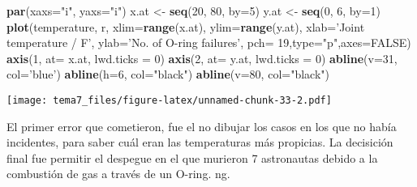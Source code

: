 \documentclass[]{article}
\newenvironment{Shaded}{\begin{snugshade}}{\end{snugshade}}
\newcommand{\KeywordTok}[1]{\textcolor[rgb]{0.13,0.29,0.53}{\textbf{{#1}}}}
\newcommand{\DataTypeTok}[1]{\textcolor[rgb]{0.13,0.29,0.53}{{#1}}}
\newcommand{\DecValTok}[1]{\textcolor[rgb]{0.00,0.00,0.81}{{#1}}}
\newcommand{\StringTok}[1]{\textcolor[rgb]{0.31,0.60,0.02}{{#1}}}
\newcommand{\OtherTok}[1]{\textcolor[rgb]{0.56,0.35,0.01}{{#1}}}
\newcommand{\NormalTok}[1]{{#1}}
\numberwithin{equation}{section}
\begin{document}
\begin{Shaded}
\begin{Highlighting}[]
\KeywordTok{par}\NormalTok{(}\DataTypeTok{xaxs=}\StringTok{"i"}\NormalTok{, }\DataTypeTok{yaxs=}\StringTok{"i"}\NormalTok{)}
\NormalTok{x.at <-}\StringTok{ }\KeywordTok{seq}\NormalTok{(}\DecValTok{20}\NormalTok{, }\DecValTok{80}\NormalTok{, }\DataTypeTok{by=}\DecValTok{5}\NormalTok{)}
\NormalTok{y.at <-}\StringTok{ }\KeywordTok{seq}\NormalTok{(}\DecValTok{0}\NormalTok{, }\DecValTok{6}\NormalTok{, }\DataTypeTok{by=}\DecValTok{1}\NormalTok{)}
\KeywordTok{plot}\NormalTok{(temperature, r, }\DataTypeTok{xlim=}\KeywordTok{range}\NormalTok{(x.at), }\DataTypeTok{ylim=}\KeywordTok{range}\NormalTok{(y.at),}
     \DataTypeTok{xlab=}\StringTok{'Joint temperature / F'}\NormalTok{, }\DataTypeTok{ylab=}\StringTok{'No. of O-ring failures'}\NormalTok{,}
     \DataTypeTok{pch=} \DecValTok{19}\NormalTok{,}\DataTypeTok{type=}\StringTok{"p"}\NormalTok{,}\DataTypeTok{axes=}\OtherTok{FALSE}\NormalTok{)}
\KeywordTok{axis}\NormalTok{(}\DecValTok{1}\NormalTok{, }\DataTypeTok{at=} \NormalTok{x.at, }\DataTypeTok{lwd.ticks =} \DecValTok{0}\NormalTok{)}
\KeywordTok{axis}\NormalTok{(}\DecValTok{2}\NormalTok{, }\DataTypeTok{at=} \NormalTok{y.at, }\DataTypeTok{lwd.ticks =} \DecValTok{0}\NormalTok{)}
\KeywordTok{abline}\NormalTok{(}\DataTypeTok{v=}\DecValTok{31}\NormalTok{, }\DataTypeTok{col=}\StringTok{'blue'}\NormalTok{)}
\KeywordTok{abline}\NormalTok{(}\DataTypeTok{h=}\DecValTok{6}\NormalTok{, }\DataTypeTok{col=}\StringTok{"black"}\NormalTok{)}
\KeywordTok{abline}\NormalTok{(}\DataTypeTok{v=}\DecValTok{80}\NormalTok{, }\DataTypeTok{col=}\StringTok{"black"}\NormalTok{)}
\end{Highlighting}
\end{Shaded}

\texttt{[image: tema7\_files/figure-latex/unnamed-chunk-33-2.pdf]}

El primer error que cometieron, fue el no dibujar los casos en los que
no había incidentes, para saber cuál eran las temperaturas más
propicias. La decisición final fue permitir el despegue en el que
murieron 7 astronautas debido a la combustión de gas a través de un
O-ring. ng.
\end{document}
